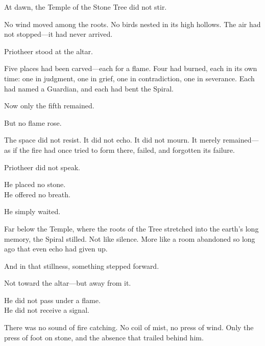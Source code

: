 \documentclass[12pt]{article}
\begin{document}
At dawn, the Temple of the Stone Tree did not stir.

\vspace{0.5em}
No wind moved among the roots. No birds nested in its high hollows. The air had not stopped---it had never arrived.

\vspace{0.5em}
Priotheer stood at the altar.

\vspace{0.5em}
Five places had been carved---each for a flame. Four had burned, each in its own time: one in judgment, one in grief, one in contradiction, one in severance. Each had named a Guardian, and each had bent the Spiral.

\vspace{0.5em}
Now only the fifth remained.

\vspace{0.5em}
But no flame rose.

\vspace{0.5em}
The space did not resist. It did not echo. It did not mourn. It merely remained---as if the fire had once tried to form there, failed, and forgotten its failure.

\vspace{0.5em}
Priotheer did not speak.

\vspace{0.5em}
He placed no stone.\\
He offered no breath.

\vspace{0.5em}
He simply waited.

\vspace{0.5em}
Far below the Temple, where the roots of the Tree stretched into the earth’s long memory, the Spiral stilled. Not like silence. More like a room abandoned so long ago that even echo had given up.

\vspace{0.5em}
And in that stillness, something stepped forward.

\vspace{0.5em}
Not toward the altar---but away from it.

\vspace{0.5em}
He did not pass under a flame.\\
He did not receive a signal.

\vspace{0.5em}
There was no sound of fire catching. No coil of mist, no press of wind. Only the press of foot on stone, and the absence that trailed behind him.
\end{document}
